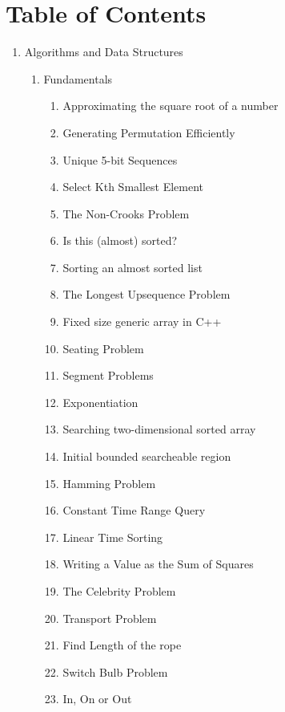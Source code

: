 \section{Table of Contents}
\begin{enumerate}[label=\Roman*]
\item Algorithms and Data Structures
    \begin{enumerate}[label=\arabic*.]
      \item Fundamentals
          \begin{enumerate}[label*=\arabic*.]
              \item Approximating the square root of a number
              \item Generating Permutation Efficiently
              \item Unique 5-bit Sequences
              \item Select Kth Smallest Element
              \item The Non-Crooks Problem
              \item Is this (almost) sorted?
              \item Sorting an almost sorted list
              \item The Longest Upsequence Problem
              \item Fixed size generic array in C++
              \item Seating Problem
              \item Segment Problems
              \item Exponentiation
              \item Searching two-dimensional sorted array
              \item Initial bounded searcheable region
              \item Hamming Problem
              \item Constant Time Range Query
              \item Linear Time Sorting
              \item Writing a Value as the Sum of Squares
              \item The Celebrity Problem
              \item Transport Problem
              \item Find Length of the rope
              \item Switch Bulb Problem
              \item In, On or Out

\end{enumerate}
\end{enumerate}
\end{enumerate}
